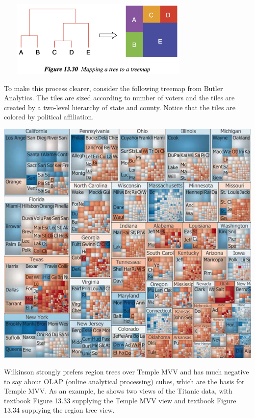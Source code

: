 \includegraphics[height=1.5in,width=4in]{fiTreeToTreemap.png}

To make this process clearer, consider the following treemap from Butler
Analytics. The tiles are sized according to number of voters and the
tiles are created by a two-level hierarchy of state and county. Notice
that the tiles are colored by political affiliation.

\bigskip

\includegraphics{fiVotingTreemap.jpg}

Wilkinson strongly prefers region trees over Temple MVV and has much
negative to say about OLAP (online analytical processing) cubes, which
are the basis for Temple MVV. As an example, he shows two views of the
Titanic data, with textbook Figure 13.33 supplying the Temple MVV view
and textbook Figure 13.34 supplying the region tree view.


